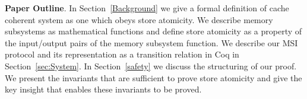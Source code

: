 
\noindent\textbf{Paper Outline}. In Section~\ref{Background} we give a
formal definition of cache coherent system as one which obeys store atomicity.
We describe memory subsystems as mathematical functions and define store
atomicity as a property of the input/output pairs of the memory subsystem
function. We describe our MSI protocol and its representation as a
transition relation in Coq in Section~\ref{sec:System}. In
Section~\ref{safety} we discuss the structuring of our proof. We
present the invariants that are sufficient to prove store atomicity and give
the key insight that enables these invariants to be proved.

